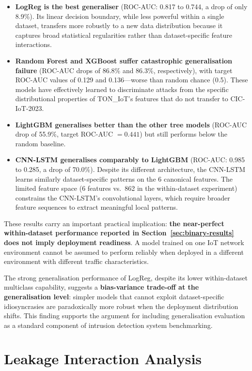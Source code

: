\documentclass[12pt,a4paper]{report}
\begin{document}
\begin{itemize}
  \item \textbf{LogReg is the best generaliser} (ROC-AUC: 0.817 to 0.744, a drop of only 8.9\%). Its linear decision boundary, while less powerful within a single dataset, transfers more robustly to a new data distribution because it captures broad statistical regularities rather than dataset-specific feature interactions.
  \item \textbf{Random Forest and XGBoost suffer catastrophic generalisation failure} (ROC-AUC drops of 86.8\% and 86.3\%, respectively), with target ROC-AUC values of 0.129 and 0.136---worse than random chance (0.5). These models have effectively learned to discriminate attacks from the specific distributional properties of TON\_IoT's features that do not transfer to CIC-IoT-2023.
  \item \textbf{LightGBM generalises better than the other tree models} (ROC-AUC drop of 55.9\%, target ROC-AUC $= 0.441$) but still performs below the random baseline.
  \item \textbf{CNN-LSTM generalises comparably to LightGBM} (ROC-AUC: 0.985 to 0.285, a drop of 70.0\%). Despite its different architecture, the CNN-LSTM learns similarly dataset-specific patterns on the 6 canonical features. The limited feature space (6 features vs.\ 862 in the within-dataset experiment) constrains the CNN-LSTM's convolutional layers, which require broader feature sequences to extract meaningful local patterns.
\end{itemize}

These results carry an important practical implication: \textbf{the near-perfect within-dataset performance reported in Section~\ref{sec:binary-results} does not imply deployment readiness}. A model trained on one IoT network environment cannot be assumed to perform reliably when deployed in a different environment with different traffic characteristics.

The strong generalisation performance of LogReg, despite its lower within-dataset multiclass capability, suggests a \textbf{bias-variance trade-off at the generalisation level}: simpler models that cannot exploit dataset-specific idiosyncrasies are paradoxically more robust when the deployment distribution shifts. This finding supports the argument for including generalisation evaluation as a standard component of intrusion detection system benchmarking.

\section{Leakage Interaction Analysis}
\label{sec:leakage-results}
\end{document}
